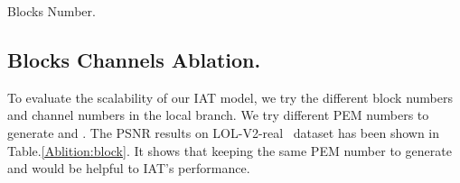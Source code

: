 \documentclass{bmvc2k}
\begin{document}
\begin{table*}[t]
    \centering
    \begin{minipage}[t]{0.34\linewidth}
        \centering
        \caption{Blocks Number.
        }
        
        \setlength\tabcolsep{3.5pt}
        \label{Ablition:block}
    \end{minipage}
    \hspace{1mm}
    \begin{minipage}[t]{0.61\linewidth}
        \centering
        \caption{Channel Number.}
        
        \setlength\tabcolsep{4pt}
        \label{Ablition:channel}
    \end{minipage}
\end{table*}

\vspace{2mm}
\noindent
\subsection{Blocks  Channels Ablation.}
To evaluate the scalability of our IAT model, we try the different block numbers and channel numbers in the local branch. We try different PEM numbers to generate  and . The PSNR results on LOL-V2-real~\cite{LOL_dataset} dataset has been shown in Table.\ref{Ablition:block}. It shows that keeping the same PEM number to generate  and  would be helpful to IAT's performance.
\end{document}
